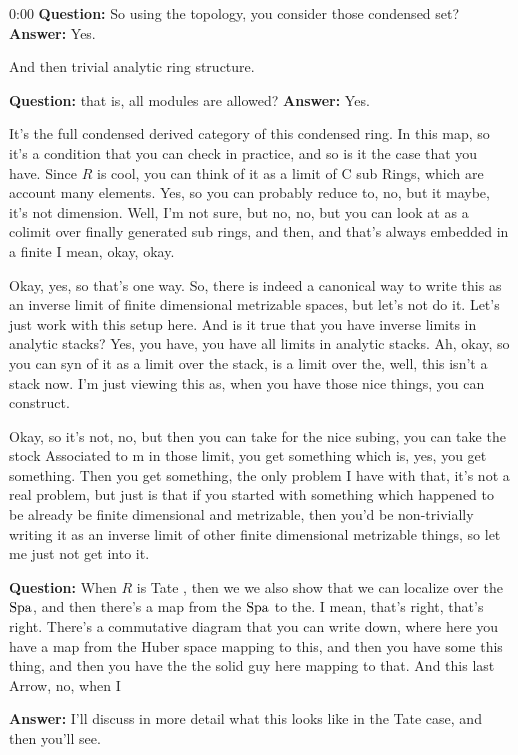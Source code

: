 \begin{unfinished}{0:00}
\textbf{Question:} So using the topology, you consider those condensed set?
\textbf{Answer:} Yes.

And then trivial analytic ring structure.

\textbf{Question:} that is, all modules are allowed?
\textbf{Answer:} Yes.


It's the full condensed derived category of this condensed ring.
In this map, so it's a condition that you can check in practice, and so is it the case that you have. Since $R$ is cool, you can think of it as a limit of C sub Rings, which are account many elements. Yes, so you can probably reduce to, no, but it maybe, it's not dimension. Well, I'm not sure, but no, no, but you can look at as a colimit over finally generated sub rings, and then, and that's always embedded in a finite I mean, okay, okay.

Okay, yes, so that's one way. So, there is indeed a canonical way to write this as an inverse limit of finite dimensional metrizable spaces, but let's not do it. Let's just work with this setup here. And is it true that you have inverse limits in analytic stacks? Yes, you have, you have all limits in analytic stacks. Ah, okay, so you can syn of it as a limit over the stack, is a limit over the, well, this isn't a stack now. I'm just viewing this as, when you have those nice things, you can construct.

Okay, so it's not, no, but then you can take for the nice subing, you can take the stock Associated to m in those limit, you get something which is, yes, you get something. Then you get something, the only problem I have with that, it's not a real problem, but just is that if you started with something which happened to be already be finite dimensional and metrizable, then you'd be non-trivially writing it as an inverse limit of other finite dimensional metrizable things, so let me just not get into it.

\textbf{Question:} When $R$ is Tate , then we we also show that we can localize over the $\operatorname{Spa}$, and then there's a map from the $\operatorname{Spa}$ to the. I mean, that's right, that's right. 
There's a commutative diagram that you can write down, where here you have a map from the Huber space mapping to this, and then you have some this thing, and then you have the the solid guy here mapping to that. And this last Arrow, no, when I 

\textbf{Answer:} I'll discuss in more detail what this looks like in the Tate case, and then you'll see.


\end{unfinished}

